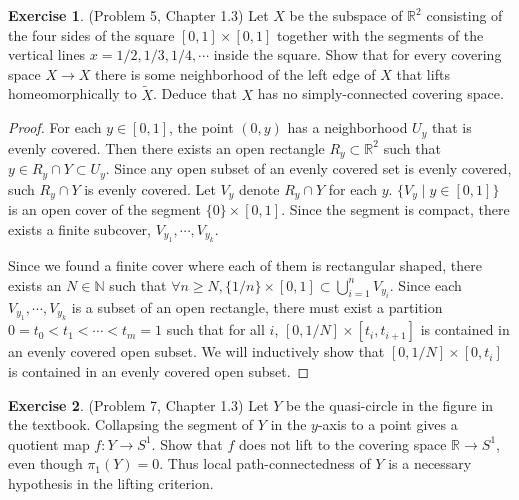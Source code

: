 \documentclass[12pt, psamsfonts]{amsart}
\theoremstyle{definition}
\newtheorem*{exer}{Exercise}
\theoremstyle{remark}
\numberwithin{equation}{section}
\begin{document}
\begin{exer}{(Problem 5, Chapter 1.3)}
  Let $X$ be the subspace of $\mathbb{R}^2$ consisting of the four sides of the square $[0, 1] \times [0, 1]$ together with the segments of the vertical lines $x = 1/2, 1/3, 1/4, \cdots$ inside the square.
  Show that for every covering space $X \rightarrow X$ there is some neighborhood of the left edge of $X$ that lifts homeomorphically to $\tilde{X}$.
  Deduce that $X$ has no simply-connected covering space.
\end{exer}

\begin{proof}
  For each $y \in [0, 1]$, the point $(0, y)$ has a neighborhood $U_y$ that is evenly covered.
  Then there exists an open rectangle $R_y \subset \mathbb{R}^2$ such that $y \in R_y \cap Y \subset U_y$.
  Since any open subset of an evenly covered set is evenly covered, such $R_y \cap Y$ is evenly covered.
  Let $V_y$ denote $R_y \cap Y$ for each $y$.
  $\{ V_y  \mid y \in [0, 1] \}$ is an open cover of the segment $\{ 0 \} \times [0, 1]$.
  Since the segment is compact, there exists a finite subcover, $V_{y_1}, \cdots, V_{y_k}$.

  Since we found a finite cover where each of them is rectangular shaped, there exists an $N \in \mathbb{N}$ such that $\forall n \geq N, \{ 1/n \} \times [0, 1] \subset \bigcup_{i=1}^{n} V_{y_i}$.
  Since each $V_{y_1}, \cdots, V_{y_k}$ is a subset of an open rectangle, there must exist a partition $0 = t_0 < t_1 < \cdots < t_m = 1$ such that for all $i$, $[0, 1/N] \times [t_i, t_{i + 1}]$ is contained in an evenly covered open subset.
  We will inductively show that $[0, 1/N] \times [0, t_i]$ is contained in an evenly covered open subset.
\end{proof}

\begin{exer}{(Problem 7, Chapter 1.3)}
  Let $Y$ be the quasi-circle in the figure in the textbook.
  Collapsing the segment of $Y$ in the $y$-axis to a point gives a quotient map $f: Y \rightarrow S^1$.
  Show that $f$ does not lift to the covering space $\mathbb{R} \rightarrow S^1$, even though $\pi_1(Y) = 0$.
  Thus local path-connectedness of $Y$ is a necessary hypothesis in the lifting criterion.
\end{exer}
\end{document}
